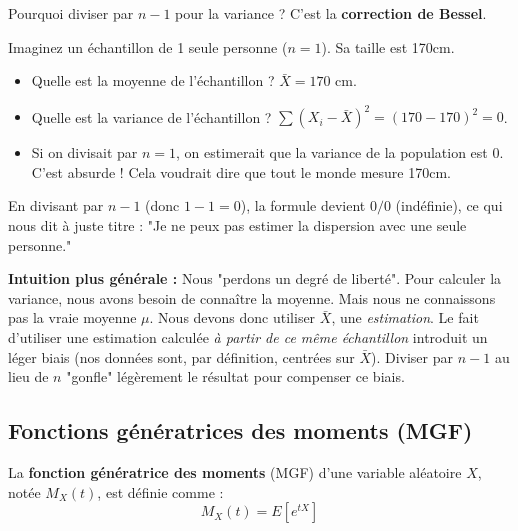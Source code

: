 \begin{remarquebox}[L'Intuition du "$n-1$"]
Pourquoi diviser par $n-1$ pour la variance ? C'est la \textbf{correction de Bessel}.

Imaginez un échantillon de 1 seule personne ($n=1$). Sa taille est 170cm.
\begin{itemize}
    \item Quelle est la moyenne de l'échantillon ? $\bar{X} = 170$ cm.
    \item Quelle est la variance de l'échantillon ? $\sum (X_i - \bar{X})^2 = (170 - 170)^2 = 0$.
    \item Si on divisait par $n=1$, on estimerait que la variance de la population est 0. C'est absurde ! Cela voudrait dire que tout le monde mesure 170cm.
\end{itemize}
En divisant par $n-1$ (donc $1-1=0$), la formule devient $0/0$ (indéfinie), ce qui nous dit à juste titre : "Je ne peux pas estimer la dispersion avec une seule personne."

\textbf{Intuition plus générale :} Nous "perdons un degré de liberté". Pour calculer la variance, nous avons besoin de connaître la moyenne. Mais nous ne connaissons pas la vraie moyenne $\mu$. Nous devons donc utiliser $\bar{X}$, une \textit{estimation}. Le fait d'utiliser une estimation calculée \textit{à partir de ce même échantillon} introduit un léger biais (nos données sont, par définition, centrées sur $\bar{X}$). Diviser par $n-1$ au lieu de $n$ "gonfle" légèrement le résultat pour compenser ce biais.
\end{remarquebox}

\subsection{Fonctions génératrices des moments (MGF)}

\begin{definitionbox}
La \textbf{fonction génératrice des moments} (MGF) d'une variable aléatoire $X$, notée $M_X(t)$, est définie comme :
$$ M_X(t) = E[e^{tX}] $$
\end{definitionbox}

